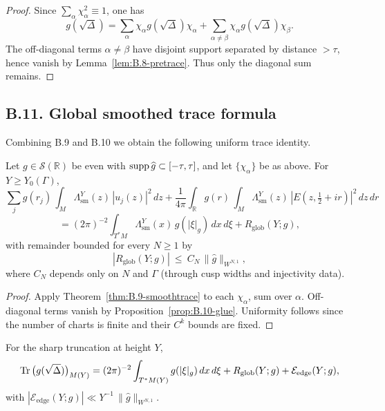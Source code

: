 \begin{proof}
Since $\sum_\alpha \chi_\alpha^2 \equiv 1$, one has
\[
g(\sqrt\Delta) = \sum_\alpha \chi_\alpha g(\sqrt\Delta)\chi_\alpha
+ \sum_{\alpha\ne\beta}\chi_\alpha g(\sqrt\Delta)\chi_\beta.
\]
The off-diagonal terms $\alpha\ne\beta$ have disjoint support separated by distance $>\tau$,
hence vanish by Lemma~\ref{lem:B.8-pretrace}. Thus only the diagonal sum remains.
\end{proof}

\subsection*{B.11. Global smoothed trace formula}

\noindent
Combining B.9 and B.10 we obtain the following uniform trace identity.

\begin{theorem}\label{thm:B.11-globaltrace}
Let $g\in \mathcal S(\mathbb R)$ be even with $\operatorname{supp} \widehat g\subset [-\tau,\tau]$,
and let $\{\chi_\alpha\}$ be as above. For $Y\ge Y_0(\Gamma)$,
\[
\sum_j g(r_j)\,\int_M \Lambda^Y_{\mathrm{sm}}(z)\,|u_j(z)|^2\,dz
+ \frac{1}{4\pi}\int_{\mathbb R} g(r)\,\int_M \Lambda^Y_{\mathrm{sm}}(z)\,|E(z,\tfrac12+ir)|^2\,dz\,dr
\]
\[
= (2\pi)^{-2}\int_{T^*M} \Lambda^Y_{\mathrm{sm}}(x)\, g(|\xi|_g)\,dx\,d\xi
+ R_{\mathrm{glob}}(Y;g),
\]
with remainder bounded for every $N\ge 1$ by
\[
|R_{\mathrm{glob}}(Y;g)| \ \le\ C_N \,\|\widehat g\|_{W^{N,1}},
\]
where $C_N$ depends only on $N$ and $\Gamma$ (through cusp widths and injectivity data).
\end{theorem}

\begin{proof}
Apply Theorem~\ref{thm:B.9-smoothtrace} to each $\chi_\alpha$, sum over $\alpha$.
Off-diagonal terms vanish by Proposition~\ref{prop:B.10-glue}.
Uniformity follows since the number of charts is finite and their $C^k$ bounds are fixed.
\end{proof}

\begin{corollary}\label{cor:B.11-sharp}
For the sharp truncation at height $Y$,
\[
\operatorname{Tr}\big(g(\sqrt\Delta)\big)_{M(Y)}
= (2\pi)^{-2}\int_{T^*M(Y)} g(|\xi|_g)\,dx\,d\xi
+ R_{\mathrm{glob}}(Y;g) + \mathcal E_{\mathrm{edge}}(Y;g),
\]
with $|\mathcal E_{\mathrm{edge}}(Y;g)|\ll Y^{-1}\,\|\widehat g\|_{W^{N,1}}$.
\end{corollary}

